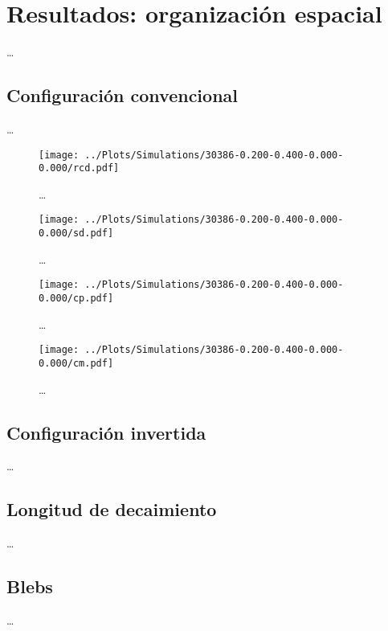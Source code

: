 \chapter{Resultados: organización espacial}
\label{cap:results}

\dots

\section{Configuración convencional}

\dots

\begin{figure}
  \centering
  \texttt{[image: ../Plots/Simulations/30386-0.200-0.400-0.000-0.000/rcd.pdf]}
  \caption{\dots}
  \label{fig:rcd}
\end{figure}

\begin{figure}
  \centering
  \texttt{[image: ../Plots/Simulations/30386-0.200-0.400-0.000-0.000/sd.pdf]}
  \caption{\dots}
  \label{fig:sd}
\end{figure}

\begin{figure}
  \centering
  \texttt{[image: ../Plots/Simulations/30386-0.200-0.400-0.000-0.000/cp.pdf]}
  \caption{\dots}
  \label{fig:cp}
\end{figure}

\begin{figure}
  \centering
  \texttt{[image: ../Plots/Simulations/30386-0.200-0.400-0.000-0.000/cm.pdf]}
  \caption{\dots}
  \label{fig:cm}
\end{figure}

\section{Configuración invertida}

\dots

\section{Longitud de decaimiento}

\dots

\section{Blebs}

\dots
